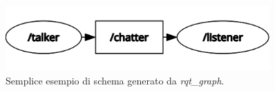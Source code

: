 \begin{figure}[h]
    \centering
    \includegraphics[width=0.9\textwidth]{figs/chapter2/rqt_example.png}
    \caption{Semplice esempio di schema generato da \emph{rqt\_graph}.}
    \label{fig:rqt_example}
\end{figure}
